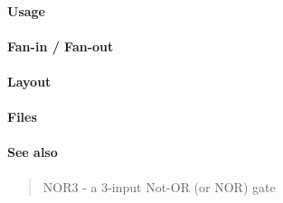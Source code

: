 \paragraph{Usage}

\paragraph{Fan-in / Fan-out}

\paragraph{Layout}

\paragraph{Files}

\paragraph{See also}
\begin{quote}
    NOR3 - a 3-input Not-OR (or NOR) gate
\end{quote}
